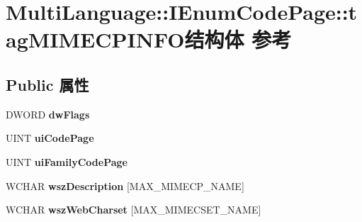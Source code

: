 \hypertarget{struct_multi_language_1_1_i_enum_code_page_1_1tag_m_i_m_e_c_p_i_n_f_o}{}\section{Multi\+Language\+:\+:I\+Enum\+Code\+Page\+:\+:tag\+M\+I\+M\+E\+C\+P\+I\+N\+F\+O结构体 参考}
\label{struct_multi_language_1_1_i_enum_code_page_1_1tag_m_i_m_e_c_p_i_n_f_o}
\subsection*{Public 属性}
\begin{DoxyCompactItemize}
\item 
\mbox{\label{struct_multi_language_1_1_i_enum_code_page_1_1tag_m_i_m_e_c_p_i_n_f_o_a5f2a659145539705a73302b0975da989}} 
D\+W\+O\+RD {\bfseries dw\+Flags}
\item 
\mbox{\label{struct_multi_language_1_1_i_enum_code_page_1_1tag_m_i_m_e_c_p_i_n_f_o_a2297a545f1614e0de9b4d84b32e1ecd5}} 
U\+I\+NT {\bfseries ui\+Code\+Page}
\item 
\mbox{\label{struct_multi_language_1_1_i_enum_code_page_1_1tag_m_i_m_e_c_p_i_n_f_o_aa618d83a16c438ade0925f406a07428e}} 
U\+I\+NT {\bfseries ui\+Family\+Code\+Page}
\item 
\mbox{\label{struct_multi_language_1_1_i_enum_code_page_1_1tag_m_i_m_e_c_p_i_n_f_o_a9e6e264eefc159b1c764c021d2a301e9}} 
W\+C\+H\+AR {\bfseries wsz\+Description} \mbox{[}M\+A\+X\+\_\+\+M\+I\+M\+E\+C\+P\+\_\+\+N\+A\+ME\mbox{]}
\item 
\mbox{\label{struct_multi_language_1_1_i_enum_code_page_1_1tag_m_i_m_e_c_p_i_n_f_o_a2715d5f325597f66c55ef157cbd53680}} 
W\+C\+H\+AR {\bfseries wsz\+Web\+Charset} \mbox{[}M\+A\+X\+\_\+\+M\+I\+M\+E\+C\+S\+E\+T\+\_\+\+N\+A\+ME\mbox{]}
\item 

\end{DoxyCompactItemize}
